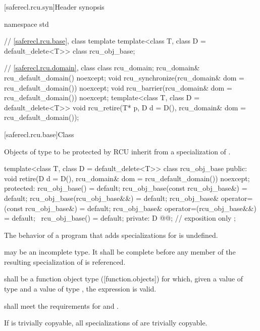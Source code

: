 [saferecl.rcu.syn]{Header  synopsis}

\begin{codeblock}
namespace std {
  // \ref{saferecl.rcu.base}, class template 
  template<class T, class D = default_delete<T>>
    class rcu_obj_base;

  // \ref{saferecl.rcu.domain}, class 
  class rcu_domain;
  rcu_domain& rcu_default_domain() noexcept;
  void rcu_synchronize(rcu_domain& dom = rcu_default_domain()) noexcept;
  void rcu_barrier(rcu_domain& dom = rcu_default_domain()) noexcept;
  template<class T, class D = default_delete<T>>
    void rcu_retire(T* p, D d = D(), rcu_domain& dom = rcu_default_domain());
}
\end{codeblock}

[saferecl.rcu.base]{Class }

Objects of type  to be protected by RCU inherit from a
specialization of .

\begin{codeblock}
template<class T, class D = default_delete<T>>
class rcu_obj_base {
public:
  void retire(D d = D(), rcu_domain& dom = rcu_default_domain()) noexcept;
protected:
  rcu_obj_base() = default;
  rcu_obj_base(const rcu_obj_base&) = default;
  rcu_obj_base(rcu_obj_base&&) = default;
  rcu_obj_base& operator=(const rcu_obj_base&) = default;
  rcu_obj_base& operator=(rcu_obj_base&&) = default;
  ~rcu_obj_base() = default;
private:
  D @@;            // exposition only
};
\end{codeblock}

\pnum
The behavior of a program that adds specializations for
 is undefined.

\pnum
{} may be an incomplete type.
It shall be complete before any member of the resulting specialization of
 is referenced.

\pnum
{} shall be a
function object type ([function.objects]) for which,
given a value  of type  and a value 
of type , the expression  is valid.

\pnum
{} shall meet the requirements for
 and .

\pnum
If  is trivially copyable, all specializations of
 are trivially copyable.

